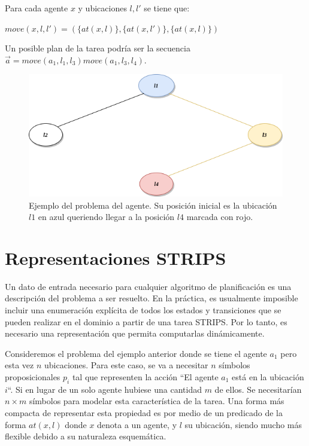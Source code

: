 Para cada agente $x$ y ubicaciones $l, l'$ se tiene que:
\begin{center}
    $move(x, l, l') = (\{at(x, l)\}, \{at(x, l')\}, \{at(x, l)\})$
\end{center}

Un posible plan de la tarea podría ser la secuencia $\vec{a} = move(a_1, l_1,
l_3)move(a_1, l_3, l_4)$.

\begin{figure}
    \centering
    \includegraphics[scale=0.5]{figures/agent_example.png}
    \caption{Ejemplo del problema del agente. Su posición inicial es la
             ubicación $l1$ en azul queriendo llegar a la posición $l4$ marcada
             con rojo.}
    \label{fig:agent_example}
\end{figure}

\section{Representaciones STRIPS}

Un dato de entrada necesario para cualquier algoritmo de planificación es una
descripción del problema a ser resuelto. En la práctica, es usualmente imposible
incluir una enumeración explícita de todos los estados y transiciones que se
pueden realizar en el dominio a partir de una tarea STRIPS. Por lo tanto, es
necesario una representación que permita computarlas dinámicamente.

Consideremos el problema del ejemplo anterior donde se tiene el agente $a_1$
pero esta vez $n$ ubicaciones. Para este caso, se va a necesitar $n$ símbolos
proposicionales $p_i$ tal que representen la acción ``El agente $a_1$ está en la
ubicación $i$``. Si en lugar de un solo agente hubiese una cantidad $m$ de
ellos. Se necesitarían $n \times m$ símbolos para modelar esta característica de
la tarea. Una forma más compacta de representar esta propiedad es por medio de
un predicado de la forma $at(x, l)$ donde $x$ denota a un agente, y $l$ su
ubicación, siendo mucho más flexible debido a su naturaleza esquemática.

